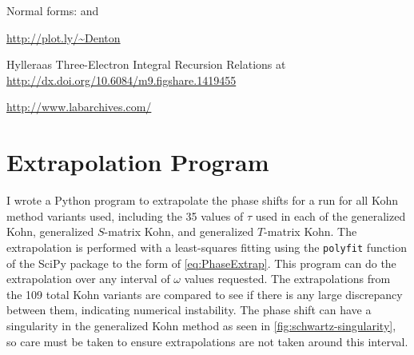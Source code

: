\documentclass[Dissertation.tex]{subfiles}
\begin{document}
Normal forms:
\cite{Phlonx} and \cite{Kent1983}


\url{http://plot.ly/~Denton}



Hylleraas Three-Electron Integral Recursion Relations at \url{http://dx.doi.org/10.6084/m9.figshare.1419455}

\url{http://www.labarchives.com/}

\cite{GitHub}
\cite{Wiki}
\cite{figshare}



\section{Extrapolation Program}
I wrote a Python \cite{Python} program to extrapolate the phase shifts for a 
run for all Kohn method variants used, including the 35 values of $\tau$ used 
in each of the generalized Kohn, generalized $S$-matrix Kohn, and generalized
$T$-matrix Kohn. The extrapolation is performed with a least-squares fitting 
using the \texttt{polyfit} function of the SciPy package \cite{SciPy} to the 
form of \cref{eq:PhaseExtrap}. This program can do the extrapolation over any 
interval of $\omega$ values requested. The extrapolations from the 109 total 
Kohn variants are compared to see if there is any large discrepancy between 
them, indicating numerical instability. The phase shift can have a 
singularity in the generalized Kohn method as seen in \cref{fig:schwartz-singularity}, so 
care must be taken to ensure extrapolations are not taken around this interval.


\biblio
\end{document}
